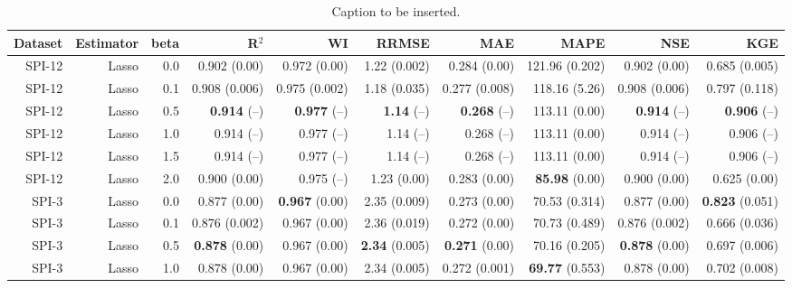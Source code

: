 \begin{table}
\centering
\caption{Caption to be inserted.}
\label{sp__comparison_datasets_table}
\begin{tabular}{rrrrrrrrrr}
\toprule
Dataset & Estimator &  beta &                R$^2$ &                   WI &                RRMSE &                  MAE &                  MAPE &                  NSE &                   KGE \\
\midrule
 SPI-12 &     Lasso &   0.0 &         0.902 (0.00) &         0.972 (0.00) &         1.22 (0.002) &         0.284 (0.00) &        121.96 (0.202) &         0.902 (0.00) &         0.685 (0.005) \\
 SPI-12 &     Lasso &   0.1 &        0.908 (0.006) &        0.975 (0.002) &         1.18 (0.035) &        0.277 (0.008) &         118.16 (5.26) &        0.908 (0.006) &         0.797 (0.118) \\
 SPI-12 &     Lasso &   0.5 &    { \bf 0.914} (--) &    { \bf 0.977} (--) &     { \bf 1.14} (--) &    { \bf 0.268} (--) &         113.11 (0.00) &    { \bf 0.914} (--) &     { \bf 0.906} (--) \\
 SPI-12 &     Lasso &   1.0 &           0.914 (--) &           0.977 (--) &            1.14 (--) &           0.268 (--) &         113.11 (0.00) &           0.914 (--) &            0.906 (--) \\
 SPI-12 &     Lasso &   1.5 &           0.914 (--) &           0.977 (--) &            1.14 (--) &           0.268 (--) &         113.11 (0.00) &           0.914 (--) &            0.906 (--) \\
 SPI-12 &     Lasso &   2.0 &         0.900 (0.00) &           0.975 (--) &          1.23 (0.00) &         0.283 (0.00) &   { \bf 85.98} (0.00) &         0.900 (0.00) &          0.625 (0.00) \\
  SPI-3 &     Lasso &   0.0 &         0.877 (0.00) &  { \bf 0.967} (0.00) &         2.35 (0.009) &         0.273 (0.00) &         70.53 (0.314) &         0.877 (0.00) &  { \bf 0.823} (0.051) \\
  SPI-3 &     Lasso &   0.1 &        0.876 (0.002) &         0.967 (0.00) &         2.36 (0.019) &         0.272 (0.00) &         70.73 (0.489) &        0.876 (0.002) &         0.666 (0.036) \\
  SPI-3 &     Lasso &   0.5 &  { \bf 0.878} (0.00) &         0.967 (0.00) &  { \bf 2.34} (0.005) &  { \bf 0.271} (0.00) &         70.16 (0.205) &  { \bf 0.878} (0.00) &         0.697 (0.006) \\
  SPI-3 &     Lasso &   1.0 &         0.878 (0.00) &         0.967 (0.00) &         2.34 (0.005) &        0.272 (0.001) &  { \bf 69.77} (0.553) &         0.878 (0.00) &         0.702 (0.008) \\

\end{tabular}
\end{table}
